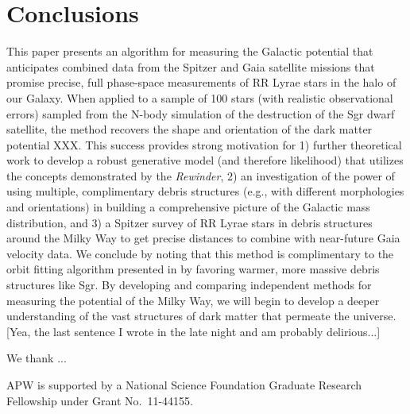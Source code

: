 \documentclass[preprint]{aastex}
\begin{document}

\section{Conclusions}
\label{sec:conclusion}

This paper presents an algorithm for measuring the Galactic potential
that anticipates combined data from the Spitzer and Gaia satellite
missions that promise precise, full phase-space measurements of RR
Lyrae stars in the halo of our Galaxy. When applied to a sample of 100
stars (with realistic observational errors) sampled from the
\cite{law10} N-body simulation of the destruction of the Sgr dwarf
satellite, the method recovers the shape and orientation of the dark
matter potential XXX. This success provides strong motivation for 1)
further theoretical work to develop a robust generative model (and therefore likelihood) that utilizes the concepts demonstrated by the \emph{Rewinder}, 2) an investigation of the power of
using multiple, complimentary debris structures (e.g., with different
morphologies and orientations) in building a comprehensive picture of
the Galactic mass distribution, and 3) a Spitzer survey of RR Lyrae
stars in debris structures around the Milky Way to get precise
distances to combine with near-future Gaia velocity data. We conclude by noting that this method is complimentary to the orbit fitting algorithm presented in \citet{sanders13b} by favoring warmer, more massive debris structures like Sgr. By developing and comparing independent methods for measuring the potential of the Milky Way, we will begin to develop a deeper understanding of the vast structures of dark matter that permeate the universe. [Yea, the last sentence I wrote in the late night and am probably delirious...]

\acknowledgments
We thank ...

APW is supported by a National Science Foundation Graduate Research
Fellowship under Grant No.\ 11-44155.



\end{document}
